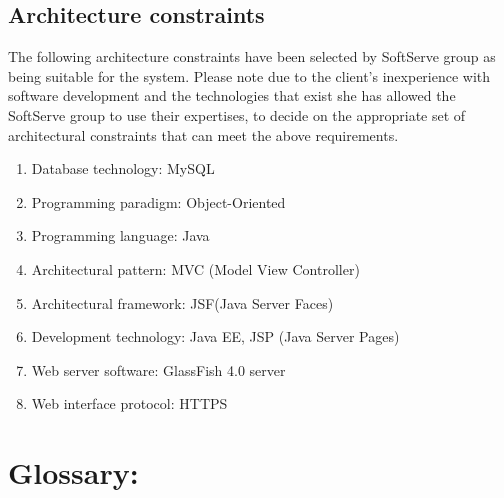 \documentclass[12pt]{article}
\begin{document}
\vspace{0.2in}

\subsection{Architecture constraints}
\vspace{0.2in}

The following architecture constraints have been selected by SoftServe group as being suitable for the system. Please note due to the client's inexperience with software development and the technologies that exist she has allowed the SoftServe group to use their expertises, to decide on the appropriate set of architectural constraints that can meet the above requirements.
\begin{enumerate}
\item Database technology: MySQL
\item Programming paradigm: Object-Oriented
\item Programming language: Java
\item Architectural pattern: MVC (Model View Controller)
\item Architectural framework: JSF(Java Server Faces)
\item Development technology: Java EE, JSP (Java Server Pages)
\item Web server software: GlassFish 4.0 server
\item Web interface protocol: HTTPS
\end{enumerate}
\vspace{0.5in}

\newpage
\section{Glossary:}
\vspace{0.2in}
\end{document}
